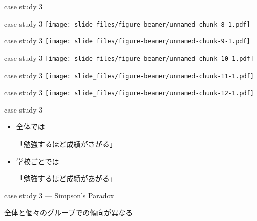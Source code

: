 \documentclass[
  ignorenonframetext,
]{beamer}
\begin{document}
\begin{frame}{case study 3}
\protect\hypertarget{case-study-3-3}{}
\end{frame}

\begin{frame}{case study 3}
\protect\hypertarget{case-study-3-4}{}
\texttt{[image: slide\_files/figure-beamer/unnamed-chunk-8-1.pdf]}
\end{frame}

\begin{frame}{case study 3}
\protect\hypertarget{case-study-3-5}{}
\texttt{[image: slide\_files/figure-beamer/unnamed-chunk-9-1.pdf]}
\end{frame}

\begin{frame}{case study 3}
\protect\hypertarget{case-study-3-6}{}
\texttt{[image: slide\_files/figure-beamer/unnamed-chunk-10-1.pdf]}
\end{frame}

\begin{frame}{case study 3}
\protect\hypertarget{case-study-3-7}{}
\texttt{[image: slide\_files/figure-beamer/unnamed-chunk-11-1.pdf]}
\end{frame}

\begin{frame}{case study 3}
\protect\hypertarget{case-study-3-8}{}
\texttt{[image: slide\_files/figure-beamer/unnamed-chunk-12-1.pdf]}
\end{frame}

\begin{frame}{case study 3}
\protect\hypertarget{case-study-3-9}{}
\LARGE

\begin{itemize}
\item[\textbullet] 全体では\par
「勉強するほど成績がさがる」
\bigskip\pause
\item[\textbullet] 学校ごとでは\par
「勉強するほど成績があがる」
\end{itemize}
\end{frame}

\begin{frame}{case study 3 --- Simpson's Paradox}
\protect\hypertarget{case-study-3-simpsons-paradox}{}
\LARGE

全体と個々のグループでの傾向が異なる

\normalsize
\end{frame}
\end{document}
